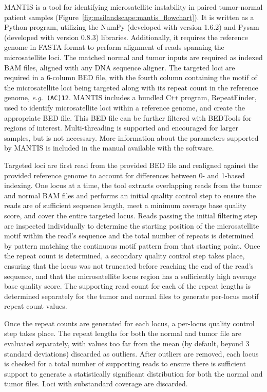 MANTIS is a tool for identifying microsatellite instability in paired tumor-normal patient samples (Figure~\ref{fig:msilandscape:mantis_flowchart}). It is written as a Python program, utilizing the NumPy (developed with version 1.6.2) \cite{2020NumPy-Array} and Pysam (developed with version 0.8.3) \cite{samtools} libraries. Additionally, it requires the reference genome in FASTA format to perform alignment of reads spanning the microsatellite loci. The matched normal and tumor inputs are required as indexed BAM files, aligned with any DNA sequence aligner. The targeted loci are required in a 6-column BED file, with the fourth column containing the motif of the microsatellite loci being targeted along with its repeat count in the reference genome, \textit{e.g.}\ \texttt{(AC)12}. MANTIS includes a bundled C\texttt{++} program, RepeatFinder, used to identify microsatellite loci within a reference genome, and create the appropriate BED file. This BED file can be further filtered with BEDTools \cite{quinlan2010} for regions of interest. Multi-threading is supported and encouraged for larger samples, but is not necessary. More information about the parameters supported by MANTIS is included in the manual available with the software.

Targeted loci are first read from the provided BED file and realigned against the provided reference genome to account for differences between 0- and 1-based indexing. One locus at a time, the tool extracts overlapping reads from the tumor and normal BAM files and performs an initial quality control step to ensure the reads are of sufficient sequence length, meet a minimum average base quality score, and cover the entire targeted locus. Reads passing the initial filtering step are inspected individually to determine the starting position of the microsatellite motif within the read's sequence and the total number of repeats is determined by pattern matching the continuous motif pattern from that starting point. Once the repeat count is determined, a secondary quality control step takes place, ensuring that the locus was not truncated before reaching the end of the read's sequence, and that the microsatellite locus region has a sufficiently high average base quality score. The supporting read count for each of the repeat lengths is determined separately for the tumor and normal files to generate per-locus motif repeat count values.

Once the repeat counts are generated for each locus, a per-locus quality control step takes place. The repeat lengths for both the normal and tumor file are evaluated separately, with values too far from the mean (by default, beyond 3 standard deviations) discarded as outliers. After outliers are removed, each locus is checked for a total number of supporting reads to ensure there is sufficient support to generate a statistically significant distribution for both the normal and tumor files. Loci with substandard coverage are discarded. 

